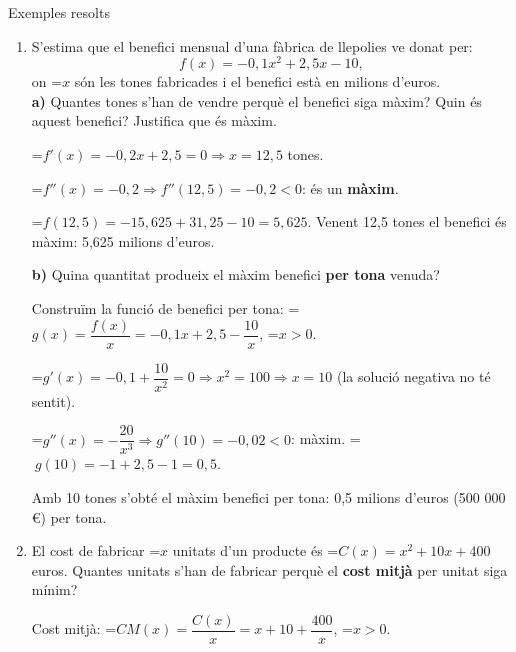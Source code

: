\documentclass[11pt,a4paper]{article}
\newcommand{\lt}{<}\newcommand{\gt}{>}
\newcommand{\fmm}[1]{\setbox0=\hbox{$#1$}\ifdim\wd0>\linewidth\[#1\]\else\mbox{\box0}\fi}
\begin{document}
  
\begin{fmex}{Exemples resolts}
\begin{enumerate}[label=\textbf{\arabic*.},leftmargin=*]
\item S'estima que el benefici mensual d'una fàbrica de llepolies ve donat per: \[f(x)=-0{,}1x^2+2{,}5x-10,\]on \fmm{x} són les tones fabricades i el benefici està en milions d'euros. \\ 
\textbf{a)} Quantes tones s'han de vendre perquè el benefici siga màxim? Quin és aquest benefici? Justifica que és màxim.
          

            

\fmm{f'(x)=-0{,}2x+2{,}5=0\Rightarrow x=12{,}5} tones.

            

\fmm{f''(x)=-0{,}2\Rightarrow f''(12{,}5)=-0{,}2\lt0}: és un \textbf{màxim}.

            

\fmm{f(12{,}5)=-15{,}625+31{,}25-10=5{,}625}. Venent 12,5 tones el benefici és màxim: 5,625 milions d'euros.

          

          

\textbf{b)} Quina quantitat produeix el màxim benefici \textbf{per tona} venuda?

          

            

Construïm la funció de benefici per tona: \fmm{g(x)=\dfrac{f(x)}{x}=-0{,}1x+2{,}5-\dfrac{10}{x}}, \fmm{x\gt0}.

            

\fmm{g'(x)=-0{,}1+\dfrac{10}{x^2}=0\Rightarrow x^2=100\Rightarrow x=10} (la solució negativa no té sentit).

            

\fmm{g''(x)=-\dfrac{20}{x^3}\Rightarrow g''(10)=-0{,}02\lt0}: màxim. \fmm{\ g(10)=-1+2{,}5-1=0{,}5}.

            

Amb 10 tones s'obté el màxim benefici per tona: 0,5 milions d'euros (500 000 €) per tona.
\item El cost de fabricar \fmm{x} unitats d'un producte és \fmm{C(x)=x^2+10x+400} euros. Quantes unitats s'han de fabricar perquè el \textbf{cost mitjà} per unitat siga mínim?
          

            

Cost mitjà: \fmm{CM(x)=\dfrac{C(x)}{x}=x+10+\dfrac{400}{x}}, \fmm{x\gt0}.


\end{enumerate}
\end{fmex}
\end{document}
